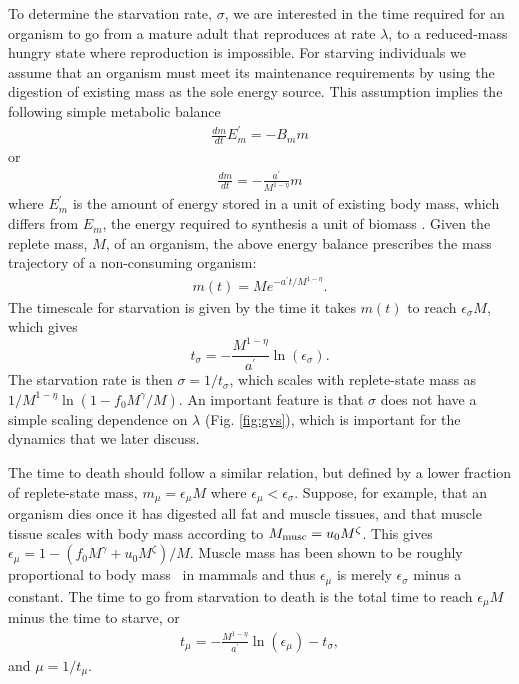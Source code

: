 \documentclass[twocolumn,preprintnumbers,amsmath,amssymb,superscriptaddress]{revtex4}
\begin{document}
\begin{bibunit}[unsrt]
To determine the starvation rate, $\sigma$, we are interested in the time
required for an organism to go from a mature adult that reproduces at rate
$\lambda$, to a
reduced-mass hungry state where reproduction is impossible.  For starving individuals we assume that an organism must meet its maintenance requirements by using the digestion of existing mass as the sole energy source.
This assumption implies the following simple metabolic balance
\begin{eqnarray}
\frac{dm}{dt}E_{m}^{\prime}=-B_{m}m
\end{eqnarray}
or
\begin{eqnarray}
\frac{dm}{dt}=-\frac{a^{\prime}}{M^{1-\eta}}m
\end{eqnarray}
where $E_{m}^{\prime}$ is the amount of energy stored in a unit of existing
body mass, which differs from $E_{m}$, the energy required to
synthesis a unit of biomass \cite{hou}. Given the replete mass, $M$, of an organism, the
above energy balance prescribes the mass trajectory of a non-consuming
organism:
\begin{eqnarray}
\label{mt}
m\left(t\right)=Me^{-a^{\prime}t/M^{1-\eta}}.
\end{eqnarray}
The timescale for starvation is
given by the time it takes $m(t)$ to reach $\epsilon_{\sigma} M$, which gives
\begin{equation}
\label{eq:sigma}
t_{\sigma}=-\frac{M^{1-\eta}}{a^{\prime}}\ln\left(\epsilon_{\sigma}\right).
\end{equation}
The starvation rate is then $\sigma=1/t_{\sigma}$, which scales with
replete-state mass as $1/M^{1-\eta}\ln\left(1-f_{0}M^{\gamma}/M\right)$.  An important
feature is that $\sigma$ does not have a simple scaling dependence on
$\lambda$ (Fig. \ref{fig:gvs}), which is important for the dynamics that we
later discuss.

The time to death should follow a similar relation, but defined by a lower
fraction of replete-state mass, $m_{\mu}=\epsilon_{\mu} M$ where $\epsilon_\mu < \epsilon_\sigma$.
Suppose, for example, that an organism dies once it has digested all fat and
muscle tissues, and that muscle tissue scales with body mass according to
$M_{\rm musc}=u_{0}M^{\zeta}$.  This gives
$\epsilon_{\mu}=1-\left(f_{0}M^{\gamma}+u_{0}M^{\zeta}\right)/M$. Muscle
mass has been shown to be roughly proportional to body mass~\cite{Folland:2008ij} in
mammals and thus $\epsilon_{\mu}$ is merely $\epsilon_{\sigma}$ minus a constant. The time to go from starvation to death is the total time to reach $\epsilon_{\mu}M$ minus the time to starve, or
\begin{eqnarray}
\label{mutimescale}
t_{\mu}=-\frac{M^{1-\eta}}{a^{\prime}}\ln\left(\epsilon_{\mu}\right)-t_{\sigma},
\end{eqnarray}
and $\mu=1/t_{\mu}$.



\end{bibunit}
\end{document}
